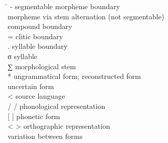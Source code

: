%



\newcommand{\TABh}{\hspace{40pt}}%

\label{symbolList}
\begin{tabbing}
\TABh \= \kill
-		\> segmentable morpheme boundary \\
\BS		\> morpheme via stem alternation (not segmentable) \\
\PLUS	\> compound boundary \\%
=		\> clitic boundary \\
.		\> syllable boundary\\
σ		\> syllable \\
∑		\> morphological stem \\
*		\> ungrammatical form; reconstructed form \\%
\QUES	\> uncertain form \\
<		\> source language \\
/ /		\> phonological representation\\
{}[ ]		\> phonetic form\\%
< >		\> orthographic representation\\
\TILDE	\> variation between forms \\
\end{tabbing}

